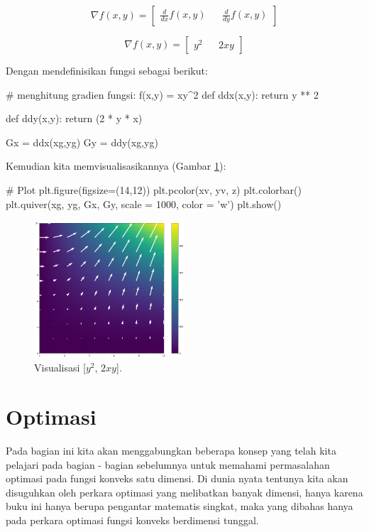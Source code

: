 $$\nabla f(x,y) = \begin{bmatrix} \frac{d}{dx}f(x,y) && \frac{d}{dy}f(x,y) \end{bmatrix}$$

$$\nabla f(x,y) = \begin{bmatrix}y^2&&2xy\end{bmatrix}$$

Dengan mendefinisikan fungsi sebagai berikut:

\begin{pyin}
# menghitung gradien fungsi: f(x,y) = xy^2
def ddx(x,y):
    return y ** 2

def ddy(x,y):
    return (2 * y * x)

Gx = ddx(xg,yg)
Gy = ddy(xg,yg)
\end{pyin}

Kemudian kita memvisualisasikannya (Gambar \ref{fig:fig8}):

\begin{pyin}
# Plot
plt.figure(figsize=(14,12))
plt.pcolor(xv, yv, z)
plt.colorbar()
plt.quiver(xg, yg, Gx, Gy, scale = 1000, color = 'w')
plt.show()
\end{pyin}

\begin{figure}[H]
    \centering
    \includegraphics[width=0.5\textwidth]{gambar/gmb8.png}
    \caption{Visualisasi [$y^2$, $2xy$].}
    \label{fig:fig8}
\end{figure}

\section{Optimasi}
Pada bagian ini kita akan menggabungkan beberapa konsep yang telah kita pelajari pada bagian - bagian sebelumnya untuk memahami permasalahan optimasi pada fungsi konveks satu dimensi. Di dunia nyata tentunya kita akan disuguhkan oleh perkara optimasi yang melibatkan banyak dimensi, hanya karena buku ini hanya berupa pengantar matematis singkat, maka yang dibahas hanya pada perkara optimasi fungsi konveks berdimensi tunggal.  

